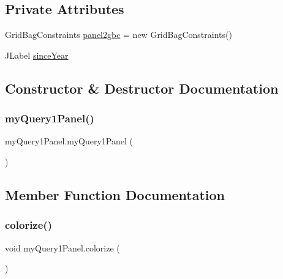 \subsection*{Private Attributes}
\begin{DoxyCompactItemize}
\item 
Grid\+Bag\+Constraints \hyperlink{classmy_query1_panel_a950bb4c948bbc32c52dcd51b9c37a8fd}{panel2gbc} = new Grid\+Bag\+Constraints()
\item 
J\+Label \hyperlink{classmy_query1_panel_a4a96735d4624a707ca5c9f774a95f054}{since\+Year}
\end{DoxyCompactItemize}


\subsection{Constructor \& Destructor Documentation}
\hypertarget{classmy_query1_panel_add6c4e09fbce53ae0b2eb34e2da0c55e}{}\label{classmy_query1_panel_add6c4e09fbce53ae0b2eb34e2da0c55e} 
\subsubsection{\texorpdfstring{my\+Query1\+Panel()}{myQuery1Panel()}}
{\footnotesize\ttfamily my\+Query1\+Panel.\+my\+Query1\+Panel (\begin{DoxyParamCaption}{ }\end{DoxyParamCaption})}



\subsection{Member Function Documentation}
\hypertarget{classmy_query1_panel_ab03012b238b9d2e22928784002a28e7f}{}\label{classmy_query1_panel_ab03012b238b9d2e22928784002a28e7f} 
\subsubsection{\texorpdfstring{colorize()}{colorize()}}
{\footnotesize\ttfamily void my\+Query1\+Panel.\+colorize (\begin{DoxyParamCaption}{ }\end{DoxyParamCaption})\hspace{0.3cm}{\ttfamily [private]}}

